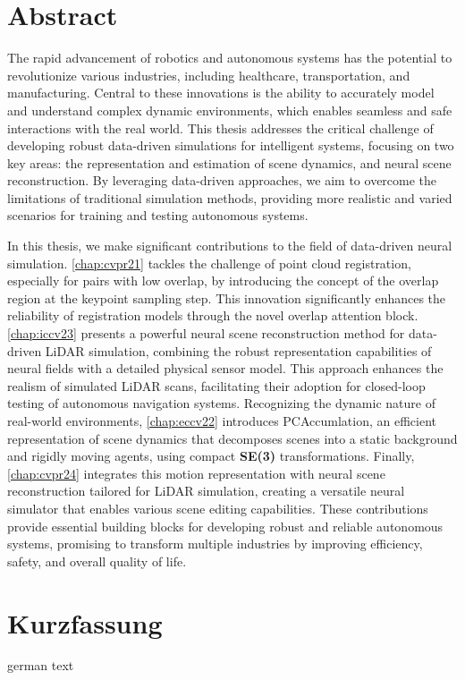 
\chapter*{Abstract}
\label{chap:abstract}
The rapid advancement of robotics and autonomous systems has the potential to revolutionize various industries, including healthcare, transportation, and manufacturing. Central to these innovations is the ability to accurately model and understand complex dynamic environments, which enables seamless and safe interactions with the real world. This thesis addresses the critical challenge of developing robust data-driven simulations for intelligent systems, focusing on two key areas: the representation and estimation of scene dynamics, and neural scene reconstruction. By leveraging data-driven approaches, we aim to overcome the limitations of traditional simulation methods, providing more realistic and varied scenarios for training and testing autonomous systems.

In this thesis, we make significant contributions to the field of data-driven neural simulation. \cref{chap:cvpr21} tackles the challenge of point cloud registration, especially for pairs with low overlap, by introducing the concept of the overlap region at the keypoint sampling step. This innovation significantly enhances the reliability of registration models through the novel overlap attention block. \cref{chap:iccv23} presents a powerful neural scene reconstruction method for data-driven LiDAR simulation, combining the robust representation capabilities of neural fields with a detailed physical sensor model. This approach enhances the realism of simulated LiDAR scans, facilitating their adoption for closed-loop testing of autonomous navigation systems. Recognizing the dynamic nature of real-world environments, \cref{chap:eccv22} introduces PCAccumlation, an efficient representation of scene dynamics that decomposes scenes into a static background and rigidly moving agents, using compact \textbf{SE(3)} transformations. Finally, \cref{chap:cvpr24} integrates this motion representation with neural scene reconstruction tailored for LiDAR simulation, creating a versatile neural simulator that enables various scene editing capabilities. These contributions provide essential building blocks for developing robust and reliable autonomous systems, promising to transform multiple industries by improving efficiency, safety, and overall quality of life.


\chapter*{Kurzfassung}
\label{chap:kurzfassung}
\foreignlanguage{german}{
german text
}